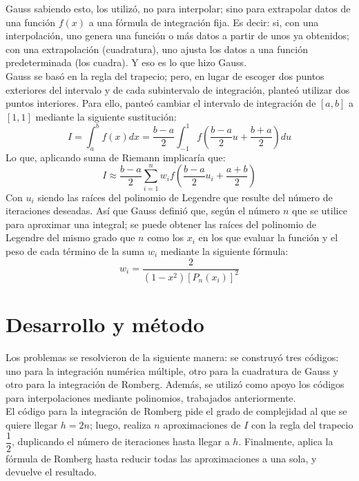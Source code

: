 \documentclass[12pt,oneside,FLEQN]{report}
\begin{document}
{Gauss sabiendo esto, los utilizó, no para interpolar; sino para extrapolar datos de una función $f(x)$ a una fórmula de integración fija. Es decir: si, con una interpolación, uno genera una función o más datos a partir de unos ya obtenidos; con una extrapolación (cuadratura), uno ajusta los datos a una función predeterminada (los cuadra). Y eso es lo que hizo Gauss.\\

Gauss se basó en la regla del trapecio; pero, en lugar de escoger dos puntos exteriores del intervalo y de cada subintervalo de integración, planteó utilizar dos puntos interiores. Para ello, panteó cambiar el intervalo de integración de $[a,b]$ a $[1,1]$ mediante la siguiente sustitución:
\begin{equation}
	I=\int_{a}^{b}f(x)dx=\dfrac{b-a}{2}\int_{-1}^{1}f(\dfrac{b-a}{2}u+\dfrac{b+a}{2})du
\end{equation}
Lo que, aplicando suma de Riemann implicaría que:
\begin{equation}
	I\approx\dfrac{b-a}{2}\sum_{i=1}^{n}w_{i}f(\dfrac{b-a}{2}u_{i}+\dfrac{a+b}{2})
\end{equation}
Con $u_{i}$ siendo las raíces del polinomio de Legendre que resulte del número de iteraciones deseadas. Así que Gauss definió que, según el número $n$ que se utilice para aproximar una integral; se puede obtener las raíces del polinomio de Legendre del mismo grado que $n$ como los $x_{i}$ en los que evaluar la función y el peso de cada término de la suma $w_{i}$ mediante la siguiente fórmula:
\begin{equation}
	w_{i}=\dfrac{2}{(1-x^{2})\left[P_{n}(x_{i})\right]^{2}}
\end{equation}
\chapter{Desarrollo y método}
Los problemas se resolvieron de la siguiente manera: se construyó tres códigos: uno para la integración numérica múltiple, otro para la cuadratura de Gauss y otro para la integración de Romberg. Además, se utilizó como apoyo los códigos para interpolaciones mediante polinomios, trabajados anteriormente.\\

El código para la integración de Romberg pide el grado de complejidad al que se quiere llegar $h=2n$; luego, realiza $n$ aproximaciones de $I$ con la regla del trapecio $\dfrac{1}{2}$, duplicando el número de iteraciones hasta llegar a $h$. Finalmente, aplica la fórmula de Romberg hasta reducir todas las aproximaciones a una sola, y devuelve el resultado. \\

}
\end{document}
